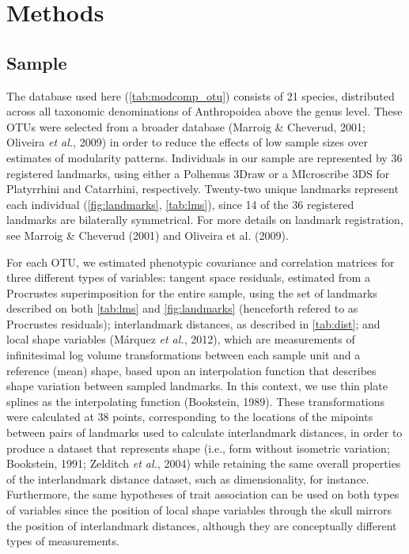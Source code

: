 \documentclass[12pt,]{article}
\begin{document}
\section{Methods}\label{methods}

\subsection{Sample}\label{sample}

The database used here (\autoref{tab:modcomp_otu}) consists of 21
species, distributed across all taxonomic denominations of Anthropoidea
above the genus level. These OTUs were selected from a broader database
(Marroig \& Cheverud, 2001; Oliveira \emph{et al.}, 2009) in order to
reduce the effects of low sample sizes over estimates of modularity
patterns. Individuals in our sample are represented by 36 registered
landmarks, using either a Polhemus 3Draw or a MIcroscribe 3DS for
Platyrrhini and Catarrhini, respectively. Twenty-two unique landmarks
represent each individual (\autoref{fig:landmarks}, \autoref{tab:lms}),
since 14 of the 36 registered landmarks are bilaterally symmetrical. For
more details on landmark registration, see Marroig \& Cheverud (2001)
and Oliveira et al. (2009).



For each OTU, we estimated phenotypic covariance and correlation
matrices for three different types of variables: tangent space
residuals, estimated from a Procrustes superimposition for the entire
sample, using the set of landmarks described on both \autoref{tab:lms}
and \autoref{fig:landmarks} (henceforth refered to as Procrustes
residuals); interlandmark distances, as described in \autoref{tab:dist};
and local shape variables (Márquez \emph{et al.}, 2012), which are
measurements of infinitesimal log volume transformations between each
sample unit and a reference (mean) shape, based upon an interpolation
function that describes shape variation between sampled landmarks. In
this context, we use thin plate splines as the interpolating function
(Bookstein, 1989). These transformations were calculated at 38 points,
corresponding to the locations of the mipoints between pairs of
landmarks used to calculate interlandmark distances, in order to produce
a dataset that represents shape (i.e., form without isometric variation;
Bookstein, 1991; Zelditch \emph{et al.}, 2004) while retaining the same
overall properties of the interlandmark distance dataset, such as
dimensionality, for instance. Furthermore, the same hypotheses of trait
association can be used on both types of variables since the position of
local shape variables through the skull mirrors the position of
interlandmark distances, although they are conceptually different types
of measurements.
\end{document}
